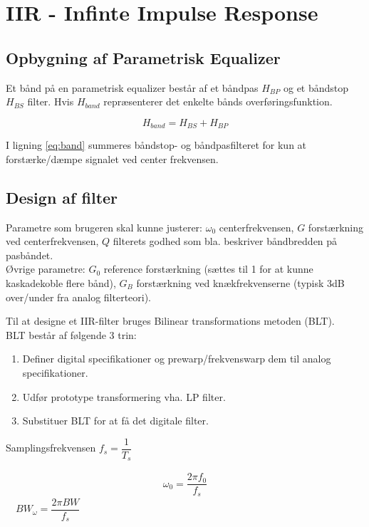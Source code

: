 \section{IIR - Infinte Impulse Response}\label{sec:iir} 

    \subsection{Opbygning af Parametrisk Equalizer}

    Et bånd på en parametrisk equalizer består af et båndpas $H_{BP}$ og et båndstop $H_{BS}$ filter. Hvis
    $H_{band}$ repræsenterer det enkelte bånds overføringsfunktion.

    \begin{equation}
    H_{band} =  H_{BS} +  H_{BP}
    \label{eq:band}
    \end{equation}

    I ligning \ref{eq:band} summeres båndstop- og båndpasfilteret for kun
    at forstærke/dæmpe signalet ved center frekvensen.

    \subsection{Design af filter}
    Parametre som brugeren skal kunne justerer: $\omega_0$ centerfrekvensen, $G$ forstærkning ved centerfrekvensen, $Q$ filterets godhed som bla. beskriver
    båndbredden på pasbåndet.\\
    Øvrige parametre:
    $G_0$ reference forstærkning (sættes til 1 for at kunne kaskadekoble flere bånd), $G_B$ forstærkning ved knækfrekvenserne (typisk 3dB over/under fra analog filterteori).
    
    Til at designe et IIR-filter bruges Bilinear transformations metoden (BLT).\\
    BLT består af følgende 3 trin:
    \begin{enumerate}
        \item Definer digital specifikationer og prewarp/frekvenswarp dem til analog specifikationer.
        \item Udfør prototype transformering vha. LP filter.
        \item Substituer BLT for at få det digitale filter.
    \end{enumerate}
    
    Samplingsfrekvensen $f_s = \dfrac{1}{T_s}$

    \begin{align*}
    \omega_0 = \dfrac{2 \pi f_0}{f_s}
    \end{align*}
$\quad BW_\omega = \dfrac{2 \pi BW }{f_s}$
